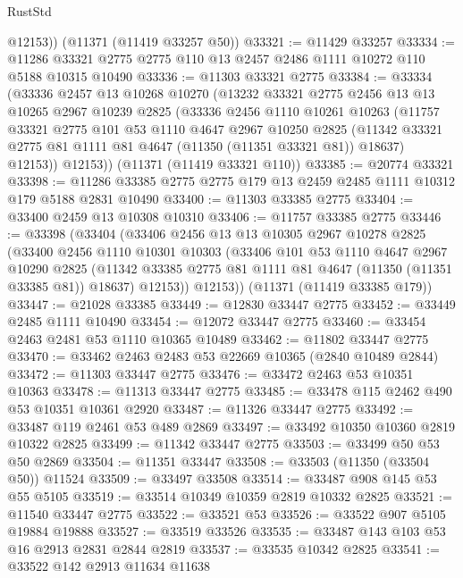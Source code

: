 \begin{lexlean}{RustStd}
\begin{coremodule}
        @12153))
    (@11371 (@11419 @33257 @50))
@33321 := @11429 @33257
@33334 := @11286 @33321 @2775 @2775 @110 @13 @2457 @2486 @1111 @10272 @110 @5188 @10315 @10490
@33336 := @11303 @33321 @2775
@33384 := @33334
    (@33336
      @2457
      @13
      @10268
      @10270
      (@13232
        @33321
        @2775
        @2456
        @13
        @13
        @10265
        @2967
        @10239
        @2825
        (@33336
          @2456
          @1110
          @10261
          @10263
          (@11757
            @33321
            @2775
            @101
            @53
            @1110
            @4647
            @2967
            @10250
            @2825
            (@11342 @33321 @2775 @81 @1111 @81 @4647 (@11350 (@11351 @33321 @81)) @18637)
            @12153))
        @12153))
    (@11371 (@11419 @33321 @110))
@33385 := @20774 @33321
@33398 := @11286 @33385 @2775 @2775 @179 @13 @2459 @2485 @1111 @10312 @179 @5188 @2831 @10490
@33400 := @11303 @33385 @2775
@33404 := @33400 @2459 @13 @10308 @10310
@33406 := @11757 @33385 @2775
@33446 := @33398
    (@33404
      (@33406
        @2456
        @13
        @13
        @10305
        @2967
        @10278
        @2825
        (@33400
          @2456
          @1110
          @10301
          @10303
          (@33406
            @101
            @53
            @1110
            @4647
            @2967
            @10290
            @2825
            (@11342 @33385 @2775 @81 @1111 @81 @4647 (@11350 (@11351 @33385 @81)) @18637)
            @12153))
        @12153))
    (@11371 (@11419 @33385 @179))
@33447 := @21028 @33385
@33449 := @12830 @33447 @2775
@33452 := @33449 @2485 @1111 @10490
@33454 := @12072 @33447 @2775
@33460 := @33454 @2463 @2481 @53 @1110 @10365 @10489
@33462 := @11802 @33447 @2775
@33470 := @33462 @2463 @2483 @53 @22669 @10365 (@2840 @10489 @2844)
@33472 := @11303 @33447 @2775
@33476 := @33472 @2463 @53 @10351 @10363
@33478 := @11313 @33447 @2775
@33485 := @33478 @115 @2462 @490 @53 @10351 @10361 @2920
@33487 := @11326 @33447 @2775
@33492 := @33487 @119 @2461 @53 @489 @2869
@33497 := @33492 @10350 @10360 @2819 @10322 @2825
@33499 := @11342 @33447 @2775
@33503 := @33499 @50 @53 @50 @2869
@33504 := @11351 @33447
@33508 := @33503 (@11350 (@33504 @50)) @11524
@33509 := @33497 @33508
@33514 := @33487 @908 @145 @53 @55 @5105
@33519 := @33514 @10349 @10359 @2819 @10332 @2825
@33521 := @11540 @33447 @2775
@33522 := @33521 @53
@33526 := @33522 @907 @5105 @19884 @19888
@33527 := @33519 @33526
@33535 := @33487 @143 @103 @53 @16 @2913 @2831 @2844 @2819
@33537 := @33535 @10342 @2825
@33541 := @33522 @142 @2913 @11634 @11638

\end{coremodule}
\end{lexlean}
